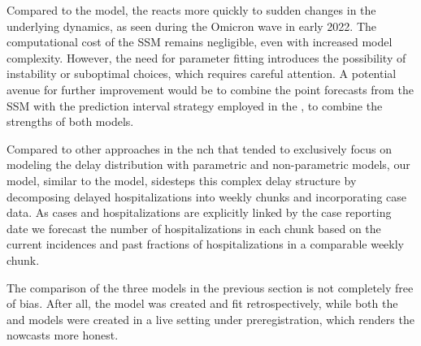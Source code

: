 Compared to the \ilmpropsmall model, the \ssm reacts more quickly to sudden changes in the underlying dynamics, as seen during the Omicron wave in early 2022. 
The computational cost of the SSM remains negligible, even with increased model complexity.
However, the need for parameter fitting introduces the possibility of instability or suboptimal choices, which requires careful attention. 
A potential avenue for further improvement would be to combine the point forecasts from the SSM with the prediction interval strategy employed in the \ilmpropbig, to combine the strengths of both models.

Compared to other approaches in the \gls{nch} that tended to exclusively focus on modeling the delay distribution with parametric and non-parametric models, our \ssm model, similar to the \ilmpropsmall model, sidesteps this complex delay structure by decomposing delayed hospitalizations into weekly chunks and incorporating case data. As cases and hospitalizations are explicitly linked by the case reporting date we forecast the number of hospitalizations in each chunk based on the current incidences and past fractions of hospitalizations in a comparable weekly chunk. 

The comparison of the three models in the previous section is not completely free of bias. After all, the \ssm model was created and fit retrospectively, while both the \ilmpropsmall and \ensemble models were created in a live setting under preregistration, which renders the nowcasts more honest.